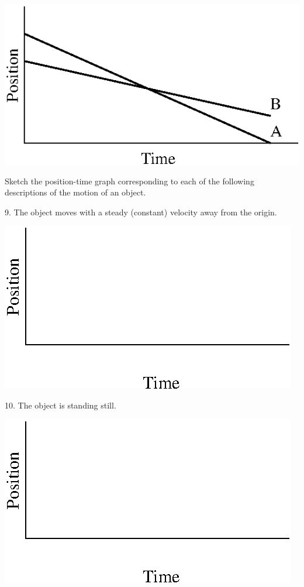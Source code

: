 \vspace{0.3cm}
{\par\raggedright \includegraphics{position/position_fig12.eps} \par}
\vspace{0.3cm}

Sketch the position-time graph corresponding to each of the following descriptions
of the motion of an object.

9. The object moves with a steady (constant) velocity away from the origin.

\vspace{0.3cm}
{\par\centering \includegraphics{position/position_fig13.eps} \par}
\vspace{0.3cm}

10. The object is standing still.

\vspace{0.3cm}
{\par\centering \includegraphics{position/position_fig13.eps} \par}
\vspace{0.3cm}

